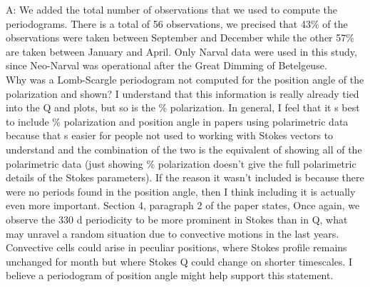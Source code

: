 \documentclass{article}
\begin{document}
A: We added the total number of observations that we used to compute the periodograms. There is a total of 56 observations, we precised that 43\% of the observations were taken between September and December while the other 57\% are taken between January and April. Only Narval data were used in this study, since Neo-Narval was operational after the Great Dimming of Betelgeuse.\\ 

Why was a Lomb-Scargle periodogram not computed for the position angle of the polarization
and shown? I understand that this information is really already tied into the Q and plots, but
so is the \% polarization. In general, I feel that it s best to include \% polarization and position angle
in papers using polarimetric data because that s easier for people not used to working with
Stokes vectors to understand and the combination of the two is the equivalent of showing all of the polarimetric data (just showing \% polarization doesn’t give the full polarimetric details of the
Stokes parameters). If the reason it wasn’t included is because there were no periods found in
the position angle, then I think including it is actually even more important. Section 4, paragraph
2 of the paper states, Once again, we observe the 330 d periodicity to be more prominent in
Stokes than in Q, what may unravel a random situation due to convective motions in the last
years. Convective cells could arise in peculiar positions, where Stokes profile remains
unchanged for month but where Stokes Q could change on shorter timescales. I believe a
periodogram of position angle might help support this statement.\\
\end{document}
